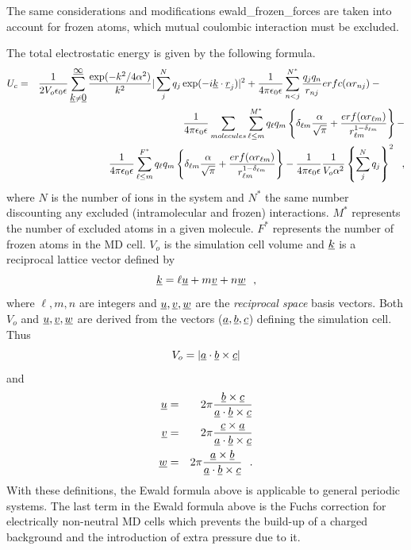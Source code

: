 The same considerations and modifications {\sc
ewald\_frozen\_forces} are taken into account for frozen atoms,
which mutual coulombic interaction must be excluded.

The total electrostatic energy is given by the following formula.
\begin{eqnarray}
U_{c}&=&\frac{1}{2V_{o} \epsilon_{0}\epsilon} \sum_{\mbox{$\underline{k}$} \neq
\mbox{$\underline{0}$}}^{\mbox{$\underline{\infty}$}} \frac{\exp(-k^{2}/4\alpha^{2})}{k^{2}}
|\sum_{j}^{N} q_{j}\exp(-i\mbox{$\underline{k}$}\cdot\mbox{$\underline{r}$}_{j})|^{2} +
\frac{1}{4\pi\epsilon_{0}\epsilon} \sum_{n<j}^{N^{*}} \frac{q_{j}q_{n}}
{r_{nj}} erfc(\alpha r_{nj}) - \phantom{xxxx} \nonumber \\
& & \frac{1}{4\pi\epsilon_{0}\epsilon} \sum_{molecules}
\sum_{\ell\le m}^{M^{*}} q_{\ell}q_{m} \left\{ \delta_{\ell m}
\frac{\alpha}{\sqrt{\pi}} + \frac{erf(\alpha r_{\ell m})}{r_{\ell
m}^{1-\delta_{\ell m}}} \right\} - \\
& & \frac{1}{4\pi\epsilon_{0}\epsilon} \sum_{\ell\le m}^{F^{*}}
q_{\ell}q_{m} \left\{ \delta_{\ell m} \frac{\alpha}{\sqrt{\pi}} +
\frac{erf(\alpha r_{\ell m})}{r_{\ell m}^{1-\delta_{\ell m}}}
\right\} - \frac{1}{4\pi\epsilon_{0}\epsilon} \frac{1}{V_{o} \alpha^{2}}
\left\{ \sum_{j}^{N} q_{j} \right\}^{2}~~, \nonumber
\end{eqnarray}
where $N$ is the number of ions in the system and $N^{*}$ the same
number discounting any excluded (intramolecular and frozen)
interactions.  $M^{*}$ represents the number of excluded atoms in
a given molecule.  $F^{*}$ represents the number of frozen atoms
in the MD cell.  $V_{o}$ is the simulation cell volume and
$\mbox{$\underline{k}$}$ is a reciprocal lattice vector defined by
\begin{equation}
\mbox{$\underline{k}$} = \ell \mbox{$\underline{u}$} + m \mbox{$\underline{v}$} + n \mbox{$\underline{w}$} \label{k-vector}~~,
\end{equation}
where $\ell,m,n$ are integers and $\mbox{$\underline{u}$},\mbox{$\underline{v}$},\mbox{$\underline{w}$}$ are
the {\em reciprocal space} basis vectors.  Both $V_{o}$ and
$\mbox{$\underline{u}$},\mbox{$\underline{v}$},\mbox{$\underline{w}$}$ are derived from the vectors
($\mbox{$\underline{a}$},\mbox{$\underline{b}$},\mbox{$\underline{c}$}$) defining the simulation cell.  Thus
\begin{equation}
V_{o} = |\mbox{$\underline{a}$} \cdot \mbox{$\underline{b}$} \times \mbox{$\underline{c}$}|
\end{equation}
and
\begin{eqnarray}
\mbox{$\underline{u}$} &=& 2 \pi \frac{\mbox{$\underline{b}$} \times \mbox{$\underline{c}$}}{\mbox{$\underline{a}$} \cdot \mbox{$\underline{b}$} \times \mbox{$\underline{c}$}} \nonumber \\
\mbox{$\underline{v}$} &=& 2 \pi \frac{\mbox{$\underline{c}$} \times \mbox{$\underline{a}$}}{\mbox{$\underline{a}$} \cdot \mbox{$\underline{b}$} \times\mbox{$\underline{c}$}} \\
\mbox{$\underline{w}$} &=& 2 \pi \frac{\mbox{$\underline{a}$} \times \mbox{$\underline{b}$}}{\mbox{$\underline{a}$} \cdot \mbox{$\underline{b}$} \times \mbox{$\underline{c}$}}~~. \nonumber
\end{eqnarray}
With these definitions, the Ewald formula above is applicable to
general periodic systems.  The last term in the Ewald formula above
is the Fuchs correction \cite{fuchs-35a} for electrically
non-neutral MD cells which prevents the build-up of a charged
background and the introduction of extra pressure due to it.


